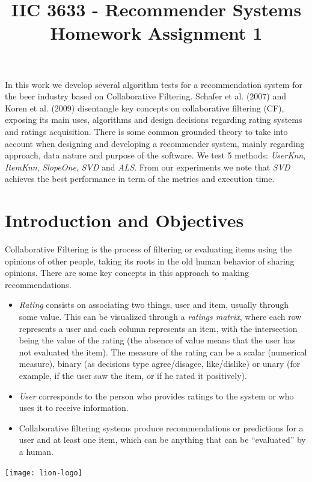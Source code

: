 \documentclass[letterpaper, 10 pt, conference]{ieeeconf}  %
\title{\LARGE \bf
IIC 3633 - Recommender Systems\\
Homework Assignment 1
}
\begin{document}
\maketitle
\thispagestyle{empty}
\pagestyle{empty}



\justify
In this work we develop several algorithm tests for a recommendation system for the beer industry based on Collaborative Filtering. Schafer et al. (2007) \cite{c1} and Koren et al. (2009) \cite{c3} disentangle key concepts on collaborative filtering (CF), exposing its main uses, algorithms and design decisions regarding rating systems and ratings acquisition. 
There is some common grounded theory to take into account when designing and developing a recommender system, mainly regarding approach, data nature and purpose of the software. We test 5 methods: \textit{UserKnn}, \textit{ItemKnn}, \textit{SlopeOne}, \textit{SVD} and \textit{ALS}. From our experiments we note that \textit{SVD} achieves the best performance in term of the metrics and execution time.

\section{Introduction and Objectives}

Collaborative Filtering is the process of filtering or evaluating items using the opinions of other people, taking its roots in the old human behavior of sharing opinions. There are some key concepts in this approach to making recommendations. 

\begin{itemize}

    \item \textit{Rating} consists on associating two things, user and item, usually through some value. This can be visualized through a \textit{ratings matrix}, where each row represents a user and each column represents an item, with the intersection being the value of the rating (the absence of value means that the user has not evaluated the item). The measure of the rating can be a scalar (numerical measure), binary (as decisions type agree/disagee, like/dislike) or unary (for example, if the user saw the item, or if he rated it positively).

    \item \textit{User} corresponds to the person who provides ratings to the system or who uses it to receive information.
    
    \item Collaborative filtering systems produce recommendations or predictions for a user and at least one item, which can be anything that can be ``evaluated'' by a human.

\end{itemize}\texttt{[image: lion-logo]}
\end{document}

